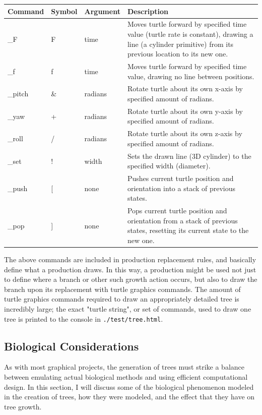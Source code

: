 \documentclass{article}
\newcommand{\tab}{\hspace*{2em}}
\begin{document}
\begin{center}
\begin{tabular}{|l|l|l|p{7cm}|}
    \hline
    Command & Symbol & Argument & Description \\ \hline \hline
    \_F & F & time & Moves turtle forward by specified time value (turtle rate is constant),
        drawing a line (a cylinder primitive) from its previous location to its new one. \\\hline
    \_f & f & time & Moves turtle forward by specified time value, drawing no line between
        positions. \\\hline
    \_pitch & \& & radians & Rotate turtle about its own x-axis by specified amount of
        radians. \\\hline
    \_yaw & + & radians & Rotate turtle about its own y-axis by specified amount of
        radians. \\\hline
    \_roll & / & radians & Rotate turtle about its own z-axis by specified amount of
        radians. \\\hline
    \_set & ! & width & Sets the drawn line (3D cylinder) to the specified width
        (diameter). \\\hline
    \_push & [ & none & Pushes current turtle position and orientation into a stack of previous
        states. \\\hline
    \_pop & ] & none & Pops current turtle position and orientation from a stack of previous
        states, resetting its current state to the new one. \\\hline

\end{tabular}
\end{center}
    \tab The above commands are included in production replacement rules, and basically define what
a production draws. In this way, a production might be used not just to define where a branch or
other such growth action occurs, but also to draw the branch upon its replacement with turtle
graphics commands. The amount of turtle graphics commands required to draw an appropriately
detailed tree is incredibly large; the exact "turtle string", or set of commands, used to draw one
tree is printed to the console in \verb|./test/tree.html|.

        \subsection{Biological Considerations}
    \tab As with most graphical projects, the generation of trees must strike a balance between
emulating actual biological methods and using efficient computational design. In this section, I
will discuss some of the biological phenomenon modeled in the creation of trees, how they were
modeled, and the effect that they have on tree growth. 
\end{document}
